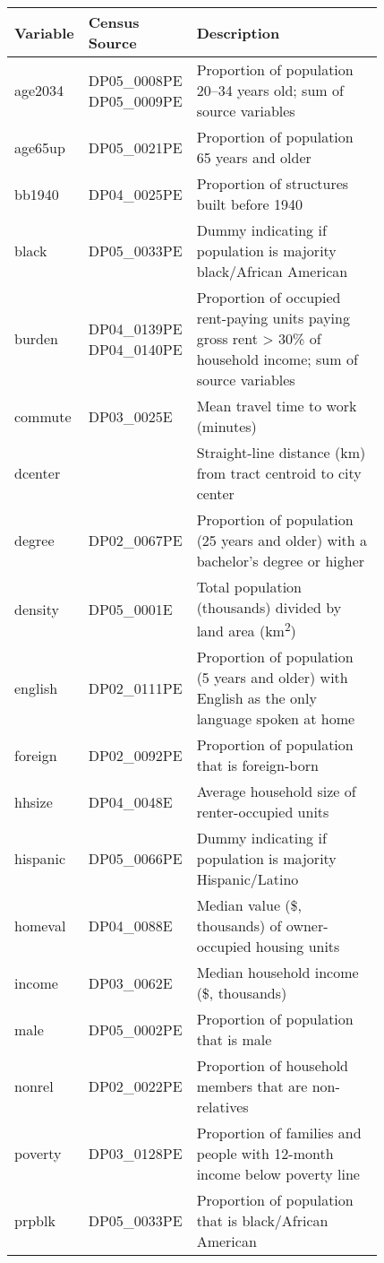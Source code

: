 \begin{tabular}{l p{0.15\linewidth} p{0.675\linewidth}}
	\toprule
	Variable & Census Source & Description \\
	\midrule
	age2034  & DP05\_0008PE DP05\_0009PE & Proportion of population 20--34 years old; sum of source variables\\
	age65up  & DP05\_0021PE & Proportion of population 65 years and older\\
	bb1940   & DP04\_0025PE & Proportion of structures built before 1940\\
	black    & DP05\_0033PE & Dummy indicating if population is majority black/African American\\
	burden   & DP04\_0139PE DP04\_0140PE & Proportion of occupied rent-paying units paying gross rent > 30\% of household income; sum of source variables\\
	commute  & DP03\_0025E  & Mean travel time to work (minutes)\\
	dcenter  &              & Straight-line distance (km) from tract centroid to city center\\
	degree   & DP02\_0067PE & Proportion of population (25 years and older) with a bachelor's degree or higher\\
	density  & DP05\_0001E  & Total population (thousands) divided by land area (km\textsuperscript{2})\\
	english  & DP02\_0111PE & Proportion of population (5 years and older) with English as the only language spoken at home\\
	foreign  & DP02\_0092PE & Proportion of population that is foreign-born\\
	hhsize   & DP04\_0048E  & Average household size of renter-occupied units\\
	hispanic & DP05\_0066PE & Dummy indicating if population is majority Hispanic/Latino\\
	homeval  & DP04\_0088E  & Median value (\$, thousands) of owner-occupied housing units\\
	income   & DP03\_0062E  & Median household income (\$, thousands)\\
	male     & DP05\_0002PE & Proportion of population that is male\\
	nonrel   & DP02\_0022PE & Proportion of household members that are non-relatives\\
	poverty  & DP03\_0128PE & Proportion of families and people with 12-month income below poverty line\\
	prpblk   & DP05\_0033PE & Proportion of population that is black/African American\\

\end{tabular}
